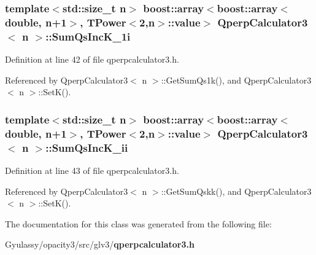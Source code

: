 \subsubsection{\setlength{\rightskip}{0pt plus 5cm}template$<$std::size\_\-t n$>$ boost::array$<$boost::array$<$double, n+1$>$, {\bf TPower}$<$2,n$>$::value$>$ {\bf QperpCalculator3}$<$ n $>$::{\bf SumQsIncK\_\-1i}\hspace{0.3cm}{\tt  [private]}}\label{classQperpCalculator3_3a76e2e7e7b4479f085a0fb7d05155fb}




Definition at line 42 of file qperpcalculator3.h.

Referenced by QperpCalculator3$<$ n $>$::GetSumQs1k(), and QperpCalculator3$<$ n $>$::SetK().
\subsubsection{\setlength{\rightskip}{0pt plus 5cm}template$<$std::size\_\-t n$>$ boost::array$<$boost::array$<$double, n+1$>$, {\bf TPower}$<$2,n$>$::value$>$ {\bf QperpCalculator3}$<$ n $>$::{\bf SumQsIncK\_\-ii}\hspace{0.3cm}{\tt  [private]}}\label{classQperpCalculator3_9beff8b0d7110b5050d1606028394beb}




Definition at line 43 of file qperpcalculator3.h.

Referenced by QperpCalculator3$<$ n $>$::GetSumQskk(), and QperpCalculator3$<$ n $>$::SetK().

The documentation for this class was generated from the following file:\begin{CompactItemize}
\item 
Gyulassy/opacity3/src/glv3/{\bf qperpcalculator3.h}\end{CompactItemize}
